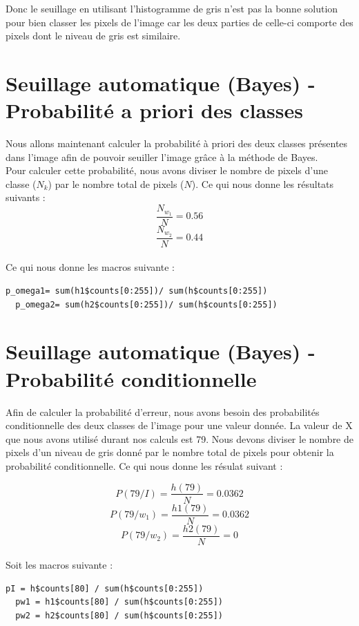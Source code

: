 \documentclass[a4paper,11pt]{article}
\begin{document}
  Donc le seuillage en utilisant l'histogramme de gris n'est pas la bonne solution pour 
  bien classer les pixels de l'image car les deux parties de celle-ci comporte des pixels
  dont le niveau de gris est similaire.
  
  \section{Seuillage automatique (Bayes) - Probabilité a priori des classes}
  Nous allons maintenant calculer la probabilité à priori des deux classes présentes dans l'image
  afin de pouvoir seuiller l'image grâce à la méthode de Bayes.\\
  
  Pour calculer cette probabilité, nous avons diviser le nombre de pixels d'une classe ($N_k$) par
  le nombre total de pixels ($N$). Ce qui nous donne les résultats suivants :
  $$\frac{N_{w_1}}{N} = 0.56$$
  $$\frac{N_{w_2}}{N} = 0.44$$\\
  
  Ce qui nous donne les macros suivante :\\
  
  \begin{lstlisting}[caption=Macros de calcule de probabilité à priori des classe $N_{w_1}$ et $N_{w_2}$]
  p_omega1= sum(h1$counts[0:255])/ sum(h$counts[0:255])
  p_omega2= sum(h2$counts[0:255])/ sum(h$counts[0:255])
  \end{lstlisting}
  
  \section{Seuillage automatique (Bayes) - Probabilité conditionnelle}
  Afin de calculer la probabilité d'erreur, nous avons besoin des probabilités conditionnelle des deux
  classes de l'image pour une valeur donnée. La valeur de X que nous avons utilisé durant nos calculs
  est 79. Nous devons diviser le nombre de pixels d'un niveau de gris donné par le nombre total de
  pixels pour obtenir la probabilité conditionnelle. Ce qui nous donne les résulat suivant :
  
  $$P(79/I) = \frac{h(79)}{N} = 0.0362$$
  $$P(79/w_1) = \frac{h1(79)}{N} = 0.0362$$
  $$P(79/w_2) = \frac{h2(79)}{N} = 0$$\\
  
  Soit les macros suivante : \\
  
  \begin{lstlisting}[caption=Macros de calcule de probabilité à priori des classe $N_{w_1}$ et $N_{w_2}$]
  pI = h$counts[80] / sum(h$counts[0:255])
  pw1 = h1$counts[80] / sum(h$counts[0:255])
  pw2 = h2$counts[80] / sum(h$counts[0:255])
  \end{lstlisting}
  
\end{document}
